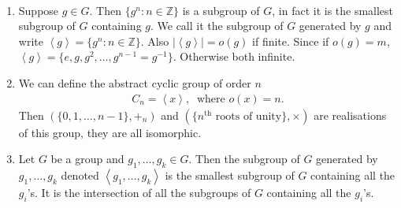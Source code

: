 \begin{remark}

~

\begin{enumerate}
\def\labelenumi{\roman{enumi}.}
\item
  Suppose \(g \in G\). Then \(\{ g^n : n \in \mathbb{Z} \}\) is a subgroup of \(G\), in fact it is the smallest subgroup of \(G\) containing \(g\).
  We call it the subgroup of \(G\) generated by \(g\) and write \(\left\langle g \right\rangle = \{ g^n : n \in \mathbb{Z} \}\). Also \(|\left\langle g \right\rangle| = o(g)\) if finite.
  Since if \(o(g) = m\), \(\left\langle g \right\rangle = \{ e, g, g^2, \ldots, g^{n-1} = g^{-1 }\}\).
  Otherwise both infinite.
\item
  We can define the abstract cyclic group of order \(n\)
  \begin{align*}
  C_n = \left\langle x \right\rangle,\ \text{ where } o(x) = n.
  \end{align*}
  Then \(( \{ 0, 1, \ldots, n-1 \}, +_n)\) and \(( \{ n^{\text{th}} \text{ roots of unity}\}, \times)\) are realisations of this group, they are all isomorphic.
\item
  Let \(G\) be a group and \(g_1, \ldots, g_k \in G\). Then the subgroup of \(G\) generated by \(g_1, \ldots, g_k\) denoted \(\left\langle g_1, \ldots, g_k \right\rangle\) is the smallest subgroup of \(G\) containing all the \(g_i\)'s. It is the intersection of all the subgroups of \(G\) containing all the \(g_i\)'s.
\end{enumerate}

\end{remark}